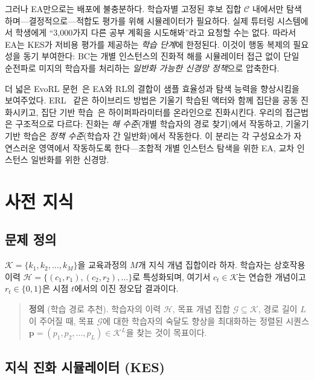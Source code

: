 \documentclass[11pt,a4paper]{article}
\begin{document}
그러나 EA만으로는 배포에 불충분하다. 학습자별 고정된 후보 집합 $\mathcal{C}$ 내에서만 탐색하며---결정적으로---적합도 평가를 위해 시뮬레이터가 필요하다. 실제 튜터링 시스템에서 학생에게 ``3,000가지 다른 공부 계획을 시도해봐''라고 요청할 수는 없다. 따라서 EA는 KES가 저비용 평가를 제공하는 \emph{학습 단계}에 한정된다. 이것이 행동 복제의 필요성을 동기 부여한다: BC는 개별 인스턴스의 진화적 해를 시뮬레이터 접근 없이 단일 순전파로 미지의 학습자를 처리하는 \emph{일반화 가능한 신경망 정책}으로 압축한다.

더 넓은 EvoRL 문헌~\cite{li2024evorl}은 EA와 RL의 결합이 샘플 효율성과 탐색 능력을 향상시킴을 보여주었다. ERL~\cite{khadka2018erl} 같은 하이브리드 방법은 기울기 학습된 액터와 함께 집단을 공동 진화시키고, 집단 기반 학습~\cite{jaderberg2017pbt}은 하이퍼파라미터를 온라인으로 진화시킨다. 우리의 접근법은 구조적으로 다르다: 진화는 \emph{해 수준}(개별 학습자의 경로 찾기)에서 작동하고, 기울기 기반 학습은 \emph{정책 수준}(학습자 간 일반화)에서 작동한다. 이 분리는 각 구성요소가 자연스러운 영역에서 작동하도록 한다---조합적 개별 인스턴스 탐색을 위한 EA, 교차 인스턴스 일반화를 위한 신경망.

\section{사전 지식}

\subsection{문제 정의}

$\mathcal{K} = \{k_1, k_2, \ldots, k_M\}$을 교육과정의 $M$개 지식 개념 집합이라 하자. 학습자는 상호작용 이력 $\mathcal{H} = \{(c_1, r_1), (c_2, r_2), \ldots\}$로 특성화되며, 여기서 $c_t \in \mathcal{K}$는 연습한 개념이고 $r_t \in \{0, 1\}$은 시점 $t$에서의 이진 정오답 결과이다.

\begin{quote}
\textbf{정의} (학습 경로 추천). 학습자의 이력 $\mathcal{H}$, 목표 개념 집합 $\mathcal{G} \subseteq \mathcal{K}$, 경로 길이 $L$이 주어질 때, 목표 $\mathcal{G}$에 대한 학습자의 숙달도 향상을 최대화하는 정렬된 시퀀스 $\mathbf{p} = (p_1, p_2, \ldots, p_L) \in \mathcal{K}^L$을 찾는 것이 목표이다.
\end{quote}

\subsection{지식 진화 시뮬레이터 (KES)}
\end{document}
